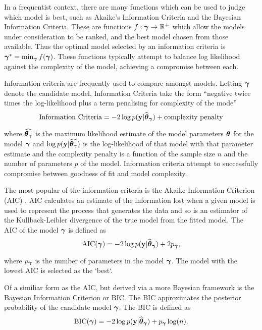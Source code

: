 In a frequentist context, there are many functions which can be used to judge which model is best, such as
Akaike's Information Criteria and the Bayesian Information Criteria. These are functions $f: {\boldsymbol \gamma} \to {\mathbb{R}}^+$
which allow the models under consideration to be ranked, and the best model chosen from those available. Thus
the optimal model selected by an information criteria is ${\boldsymbol \gamma}^* = \min_{\boldsymbol \gamma} f({\boldsymbol \gamma})$. These functions
typically attempt to balance log likelihood against the complexity of the model, achieving a compromise
between each.


Information criteria are frequently used to compare amongst models. Letting ${\boldsymbol \gamma}$ denote the candidate model,
Information Criteria take the form ``negative twice times the log-likelihood plus a term penalising for complexity of
the mode''
$$
	\text{Information Criteria} = -2 \log p({\bf y} | \widehat{{\boldsymbol \theta}}_{\boldsymbol \gamma}) + \text{complexity penalty}
$$

\noindent where $\widehat{{\boldsymbol \theta}_\gamma}$ is the maximum likelihood estimate of the model parameters
${\boldsymbol \theta}$ for the model ${\boldsymbol \gamma}$ and $\log p({\bf y} | \widehat{{\boldsymbol \theta}_\gamma})$ is the log-likelihood of that
model with that parameter estimate and the complexity penalty is a function of the sample size $n$ and the
number of parameters $p$ of the model. Information criteria attempt to successfully compromise between
goodness of fit and model complexity.

The most popular of the information criteria is the Akaike Information Criterion (AIC) \citep{Akaike1974}. AIC
calculates an estimate of the information lost when a given model is used to represent the process that
generates the data and so is an estimator of the Kullback-Leibler divergence of the true model from the fitted
model. The AIC of the model ${\boldsymbol \gamma}$ is defined as
$$
	\text{AIC}({\boldsymbol \gamma}) = -2 \log p({\bf y} | \widehat{{\boldsymbol \theta}}_{\boldsymbol \gamma}) + 2 p_{\boldsymbol \gamma},
$$

\noindent where $p_{\boldsymbol \gamma}$ is the number of parameters in the model ${\boldsymbol \gamma}$. The model with the lowest AIC
is selected as the `best`.

Of a similiar form as the AIC, but derived via a more Bayesian framework is the Bayesian Information Criterion
or BIC. The BIC approximates the posterior probability of the candidate model ${\boldsymbol \gamma}$. The BIC is defined as
$$
	\text{BIC}({\boldsymbol \gamma}) = -2 \log p({\bf y} | \widehat{{\boldsymbol \theta}}_{\boldsymbol \gamma}) + p_{\boldsymbol \gamma} \log(n).
$$

